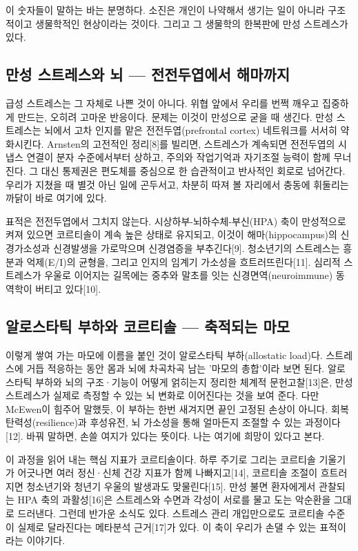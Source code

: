\documentclass[12pt,oneside]{book}
\begin{document}
이 숫자들이 말하는 바는 분명하다. 소진은 개인이 나약해서 생기는 일이 아니라 구조적이고 생물학적인 현상이라는 것이다. 그리고 그 생물학의 한복판에 만성 스트레스가 있다.

\subsection{만성 스트레스와 뇌 — 전전두엽에서 해마까지}

급성 스트레스는 그 자체로 나쁜 것이 아니다. 위협 앞에서 우리를 번쩍 깨우고 집중하게 만드는, 오히려 고마운 반응이다. 문제는 이것이 만성으로 굳을 때 생긴다. 만성 스트레스는 뇌에서 고차 인지를 맡은 전전두엽(prefrontal cortex) 네트워크를 서서히 약화시킨다. Arnsten의 고전적인 정리[8]를 빌리면, 스트레스가 계속되면 전전두엽의 시냅스 연결이 분자 수준에서부터 상하고, 주의와 작업기억과 자기조절 능력이 함께 무너진다. 그 대신 통제권은 편도체를 중심으로 한 습관적이고 반사적인 회로로 넘어간다. 우리가 지쳤을 때 별것 아닌 일에 곤두서고, 차분히 따져 볼 자리에서 충동에 휘둘리는 까닭이 바로 여기에 있다.

표적은 전전두엽에서 그치지 않는다. 시상하부-뇌하수체-부신(HPA) 축이 만성적으로 켜져 있으면 코르티솔이 계속 높은 상태로 유지되고, 이것이 해마(hippocampus)의 신경가소성과 신경발생을 가로막으며 신경염증을 부추긴다[9]. 청소년기의 스트레스는 흥분과 억제(E/I)의 균형을, 그리고 인지의 임계기 가소성을 흐트러뜨린다[11]. 심리적 스트레스가 우울로 이어지는 길목에는 중추와 말초를 잇는 신경면역(neuroimmune) 동역학이 버티고 있다[10].

\subsection{알로스타틱 부하와 코르티솔 — 축적되는 마모}

이렇게 쌓여 가는 마모에 이름을 붙인 것이 알로스타틱 부하(allostatic load)다. 스트레스에 거듭 적응하는 동안 몸과 뇌에 차곡차곡 남는 '마모의 총합'이라 보면 된다. 알로스타틱 부하와 뇌의 구조·기능이 어떻게 얽히는지 정리한 체계적 문헌고찰[13]은, 만성 스트레스가 실제로 측정할 수 있는 뇌 변화로 이어진다는 것을 보여 준다. 다만 McEwen이 힘주어 말했듯, 이 부하는 한번 새겨지면 끝인 고정된 손상이 아니다. 회복탄력성(resilience)과 후성유전, 뇌 가소성을 통해 얼마든지 조절할 수 있는 과정이다[12]. 바꿔 말하면, 손쓸 여지가 있다는 뜻이다. 나는 여기에 희망이 있다고 본다.

이 과정을 읽어 내는 핵심 지표가 코르티솔이다. 하루 주기로 그리는 코르티솔 기울기가 어긋나면 여러 정신·신체 건강 지표가 함께 나빠지고[14], 코르티솔 조절이 흐트러지면 청소년기와 청년기 우울의 발생과도 맞물린다[15]. 만성 불면 환자에게서 관찰되는 HPA 축의 과활성[16]은 스트레스와 수면과 각성이 서로를 물고 도는 악순환을 그대로 드러낸다. 그런데 반가운 소식도 있다. 스트레스 관리 개입만으로도 코르티솔 수준이 실제로 달라진다는 메타분석 근거[17]가 있다. 이 축이 우리가 손댈 수 있는 표적이라는 이야기다.
\end{document}
